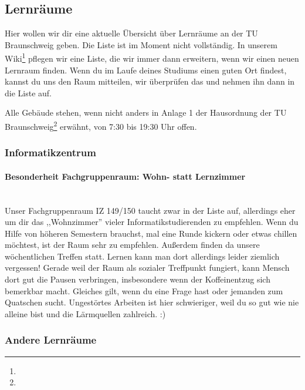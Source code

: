 
\subsection{Lernräume}


Hier wollen wir dir eine aktuelle Übersicht über Lernräume an der TU Braunschweig geben. Die Liste ist im Moment nicht vollständig. In unserem Wiki\footnote{} pflegen wir eine Liste, die wir immer dann erweitern, wenn wir einen neuen Lernraum finden. Wenn du im Laufe deines Studiums einen guten Ort findest, kannst du uns den Raum mitteilen, wir überprüfen das und nehmen ihn dann in die Liste auf.

Alle Gebäude stehen, wenn nicht anders in Anlage 1 der Hausordnung der TU Braunschweig\footnote{} erwähnt, von 7:30 bis 19:30 Uhr offen.

\subsubsection*{Informatikzentrum}



\paragraph{Besonderheit Fachgruppenraum: Wohn- statt Lernzimmer}\ \\
Unser Fachgruppenraum IZ 149/150 taucht zwar in der Liste auf, allerdings eher um dir das  ,,Wohnzimmer'' vieler Informatikstudierenden  zu empfehlen. Wenn du  Hilfe von höheren Semestern brauchst, mal eine Runde kickern oder etwas chillen möchtest, ist der Raum sehr zu empfehlen. Außerdem finden da unsere wöchentlichen Treffen statt. Lernen kann man dort allerdings leider ziemlich vergessen! Gerade weil der Raum als sozialer Treffpunkt fungiert, kann Mensch dort gut die Pausen verbringen, insbesondere wenn der Koffeinentzug sich bemerkbar macht. Gleiches gilt, wenn du eine Frage hast oder jemanden zum Quatschen sucht. Ungestörtes Arbeiten ist hier schwieriger, weil du so gut wie nie alleine bist und die Lärmquellen zahlreich. :)

\subsubsection*{Andere Lernräume}

